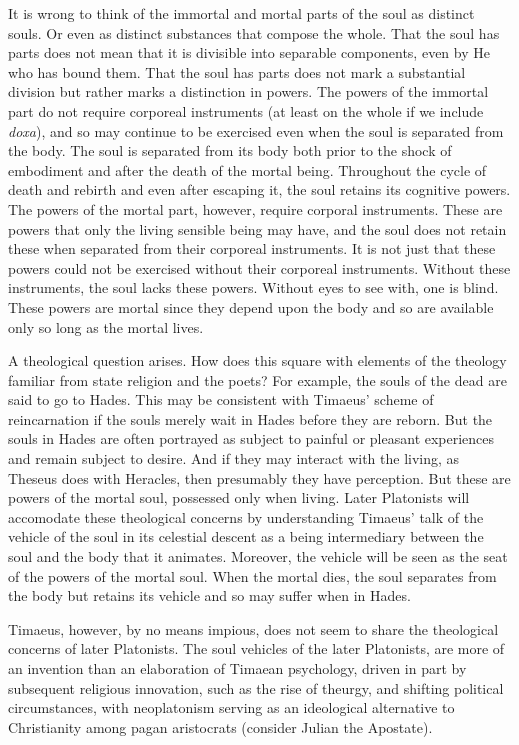 It is wrong to think of the immortal and mortal parts of the soul as distinct souls. Or even as distinct substances that compose the whole. That the soul has parts does not mean that it is divisible into separable components, even by He who has bound them. That the soul has parts does not mark a substantial division but rather marks a distinction in powers. The powers of the immortal part do not require corporeal instruments (at least on the whole if we include \emph{doxa}), and so may continue to be exercised even when the soul is separated from the body. The soul is separated from its body both prior to the shock of embodiment and after the death of the mortal being. Throughout the cycle of death and rebirth and even after escaping it, the soul retains its cognitive powers. The powers of the mortal part, however, require corporal instruments. These are powers that only the living sensible being may have, and the soul does not retain these when separated from their corporeal instruments. It is not just that these powers could not be exercised without their corporeal instruments. Without these instruments, the soul lacks these powers. Without eyes to see with, one is blind. These powers are mortal since they depend upon the body and so are available only so long as the mortal lives.

A theological question arises. How does this square with elements of the theology familiar from state religion and the poets? For example, the souls of the dead are said to go to Hades. This may be consistent with Timaeus' scheme of reincarnation if the souls merely wait in Hades before they are reborn. But the souls in Hades are often portrayed as subject to painful or pleasant experiences and remain subject to desire. And if they may interact with the living, as Theseus does with Heracles, then presumably they have perception. But these are powers of the mortal soul, possessed only when living. Later Platonists will accomodate these theological concerns by understanding Timaeus' talk of the vehicle of the soul in its celestial descent as a being intermediary between the soul and the body that it animates. Moreover, the vehicle will be seen as the seat of the powers of the mortal soul. When the mortal dies, the soul separates from the body but retains its vehicle and so may suffer when in Hades.

Timaeus, however, by no means impious, does not seem to share the theological concerns of later Platonists. The soul vehicles of the later Platonists, are more of an invention than an elaboration of Timaean psychology, driven in part by subsequent religious innovation, such as the rise of theurgy, and shifting political circumstances, with neoplatonism serving as an ideological alternative to Christianity among pagan aristocrats (consider Julian the Apostate).

